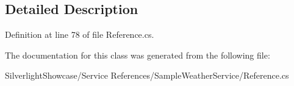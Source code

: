 \subsection{Detailed Description}


Definition at line 78 of file Reference.cs.

The documentation for this class was generated from the following file:\begin{DoxyCompactItemize}
\item 
SilverlightShowcase/Service References/SampleWeatherService/Reference.cs\end{DoxyCompactItemize}

